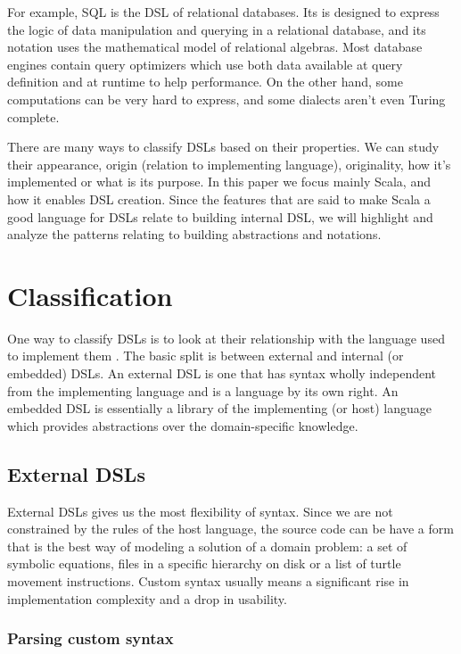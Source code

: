 For example, SQL is the DSL of relational databases. Its is designed to express the logic of data manipulation and querying in a relational database, and its notation uses the mathematical model of relational algebras. Most database engines contain query optimizers which use both data available at query definition and at runtime to help performance. On the other hand, some computations can be very hard to express, and some dialects aren't even Turing complete.

There are many ways to classify DSLs \autocite{Gunther:2011} based on their properties. We can study their appearance, origin (relation to implementing language), originality, how it's implemented or what is its purpose. In this paper we focus mainly Scala, and how it enables DSL creation. Since the features that are said to make Scala a good language for DSLs relate to building internal DSL, we will highlight and analyze the patterns relating to building abstractions and notations.

\section{Classification}
One way to classify DSLs is to look at their relationship with the language used to implement them \autocite{Artho:2015, Gunther:2011}. The basic split is between external and internal (or embedded) DSLs. An external DSL is one that has syntax wholly independent from the implementing language and is a language by its own right. An embedded DSL is essentially a library of the implementing (or host) language which provides abstractions over the domain-specific knowledge.

\subsection{External DSLs}

External DSLs gives us the most flexibility of syntax. Since we are not constrained by the rules of the host language, the source code can be have a form that is the best way of modeling a solution of a domain problem: a set of symbolic equations, files in a specific hierarchy on disk or a list of turtle movement instructions. Custom syntax usually means a significant rise in implementation complexity and a drop in usability. 

\subsubsection{Parsing custom syntax}

